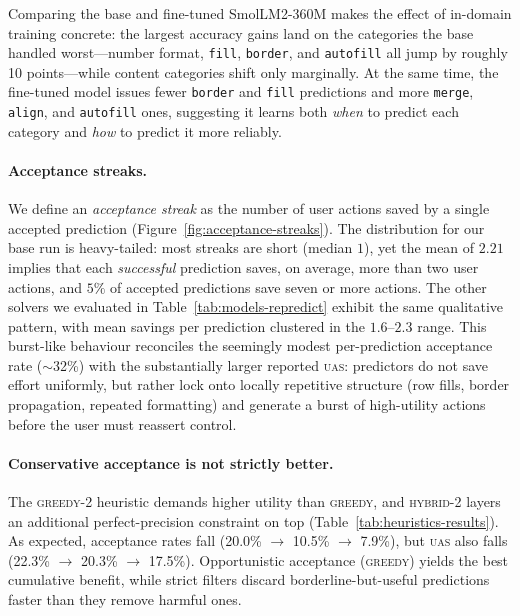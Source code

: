 \documentclass{article}
\newcommand{\op}[1]{\texttt{\small #1}}
\theoremstyle{plain}
\theoremstyle{definition}
\theoremstyle{remark}
\begin{document}
Comparing the base and fine-tuned SmolLM2-360M makes the effect of in-domain training concrete: the largest accuracy gains land on the categories the base handled worst---number format, \op{fill}, \op{border}, and \op{autofill} all jump by roughly 10 points---while content categories shift only marginally.
At the same time, the fine-tuned model issues fewer \op{border} and \op{fill} predictions and more \op{merge}, \op{align}, and \op{autofill} ones, suggesting it learns both \emph{when} to predict each category and \emph{how} to predict it more reliably.



\paragraph{Acceptance streaks.}
We define an \emph{acceptance streak} as the number of user actions saved by a single accepted prediction (Figure~\ref{fig:acceptance-streaks}). The distribution for our base run is heavy-tailed: most streaks are short (median $1$), yet the mean of $2.21$ implies that each \emph{successful} prediction saves, on average, more than two user actions, and $5\%$ of accepted predictions save seven or more actions. The other solvers we evaluated in Table~\ref{tab:models-repredict} exhibit the same qualitative pattern, with mean savings per prediction clustered in the $1.6$--$2.3$ range. This burst-like behaviour reconciles the seemingly modest per-prediction acceptance rate ($\sim$32\%) with the substantially larger reported \textsc{uas}: predictors do not save effort uniformly, but rather lock onto locally repetitive structure (row fills, border propagation, repeated formatting) and generate a burst of high-utility actions before the user must reassert control.




\paragraph{Conservative acceptance is not strictly better.}

The \textsc{greedy-2} heuristic demands higher utility than \textsc{greedy}, and \textsc{hybrid-2} layers an additional perfect-precision constraint on top (Table~\ref{tab:heuristics-results}).
As expected, acceptance rates fall (20.0\% $\to$ 10.5\% $\to$ 7.9\%), but \textsc{uas} also falls (22.3\% $\to$ 20.3\% $\to$ 17.5\%).
Opportunistic acceptance (\textsc{greedy}) yields the best cumulative benefit, while strict filters discard borderline-but-useful predictions faster than they remove harmful ones. 
\end{document}
